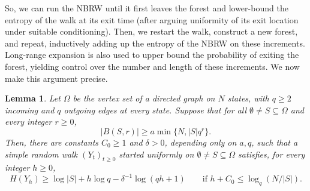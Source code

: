 \documentclass[11pt,reqno]{amsart}
\newtheorem{lemma}[theorem]{Lemma}
\theoremstyle{definition}
\begin{document}
So, we can run the NBRW until it first leaves the forest and lower-bound the entropy of the walk at its exit time (after arguing uniformity of its exit location under suitable conditioning). Then, we restart the walk, construct a new forest, and repeat, inductively adding up the entropy of the NBRW on these increments. Long-range expansion is also used to upper bound the probability of exiting the forest, yielding control over the number and length of these increments. We now make this argument precise.


\begin{lemma}\label{lem:directedentropy}
Let $\Omega$ be the vertex set of a directed graph on $N$ states,
with $q\ge2$ incoming and $q$ outgoing edges at every state. Suppose that for all $\emptyset \neq S \subseteq \Omega$ and every integer $r\ge0$,
\[
 |B(S,r)|\ge a\min\{N,|S|q^r\}.
\]
Then, there are constants $C_0\ge1$ and $\delta>0$, depending only on
$a,q$, such that a simple random walk $(Y_t)_{t\ge0}$ started uniformly on
$\emptyset \neq S \subseteq \Omega$ satisfies, for every integer $h\ge0$,
\begin{equation}\label{eq:entropybound}
 H(Y_h)\ge\log|S|+h\log q-\delta^{-1}\log(qh+1)
 \qquad\text{if }h+C_0\le\log_q(N/|S|).
\end{equation}
\end{lemma}
\end{document}

